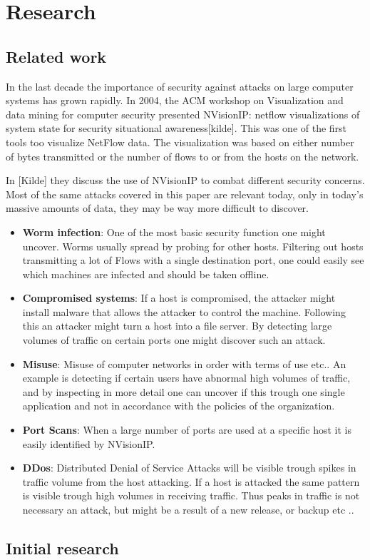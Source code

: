 \chapter{Research}
\label{chp:research} 

\section{Related work}
In the last decade the importance of security against attacks on large computer systems has grown rapidly. In 2004, the ACM workshop on Visualization and data mining for computer security presented NVisionIP: netflow visualizations of system state for security situational awareness[kilde]. This was one of the first tools too visualize NetFlow data. The visualization was based on either number of bytes transmitted or the number of flows to or from the hosts on the network. 

In [Kilde] they discuss the use of NVisionIP to combat different security concerns. Most of the same attacks covered in this paper are relevant today, only in today's massive amounts of data, they may be way more difficult to discover. 

\begin{itemize}
\item \textbf{Worm infection}: One of the most basic security function one might uncover.  Worms usually spread by probing for other hosts. Filtering out hosts transmitting a lot of Flows with a single destination port, one could easily see which machines are infected and should be taken offline. 
\item \textbf{Compromised systems}: If a host is compromised, the attacker might install malware that allows the attacker to control the machine. Following this an attacker might turn a host into a file server. By detecting large volumes of traffic on certain ports one might discover such an attack. 
\item \textbf{Misuse}: Misuse of computer networks in order with terms of use etc.. An example is detecting if certain users have abnormal high volumes of traffic, and by inspecting in more detail one can uncover if this trough one single application and not in accordance with the policies of the organization. 
\item \textbf{Port Scans}: When a large number of ports are used at a specific host it is easily identified by NVisionIP.
\item \textbf{DDos}: Distributed Denial of Service Attacks will be visible trough spikes in traffic volume from the host attacking. If a host is attacked the same pattern is visible trough high volumes in receiving traffic. Thus peaks in traffic is not necessary an attack, but might be a result of a new release, or backup etc .. 
\end{itemize}

\section{Initial research}



